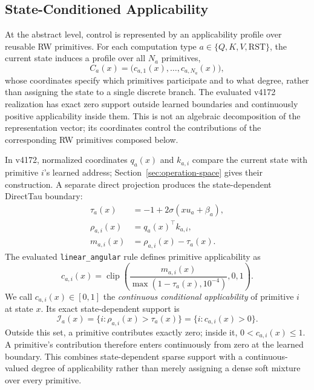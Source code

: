 \documentclass{article}
\begin{document}
\subsection{State-Conditioned Applicability}
\label{sec:applicability}

At the abstract level, control is represented by an applicability profile over
reusable RW primitives. For each computation type
\(a\in\{Q,K,V,\mathrm{RST}\}\), the current state induces a profile over all
\(N_a\) primitives,
\begin{equation}
C_a(x)=\big(c_{a,1}(x),\ldots,c_{a,N_a}(x)\big),
\label{eq:applicability_profile}
\end{equation}
whose coordinates specify which primitives participate and to what degree,
rather than assigning the state to a single discrete branch. The evaluated
v4172 realization has exact zero support outside learned boundaries and
continuously positive applicability inside them. This is not an algebraic
decomposition of the representation vector; its coordinates control the
contributions of the corresponding RW primitives composed below.

In v4172, normalized coordinates \(q_a(x)\) and \(k_{a,i}\) compare the current
state with primitive \(i\)'s learned address;
Section~\ref{sec:operation-space} gives their construction. A separate direct
projection produces the state-dependent DirectTau boundary:
\begin{align}
\tau_a(x)&=-1+2\sigma(xu_a+\beta_a),\\
\rho_{a,i}(x)&=q_a(x)^\top k_{a,i},\\
m_{a,i}(x)&=\rho_{a,i}(x)-\tau_a(x).
\label{eq:directtau}
\end{align}
The evaluated \texttt{linear\_angular} rule defines primitive applicability as
\begin{equation}
c_{a,i}(x)=
\operatorname{clip}\!\left(
\frac{m_{a,i}(x)}
{\max(1-\tau_a(x),10^{-4})},0,1\right).
\label{eq:angular_gate}
\end{equation}
We call \(c_{a,i}(x)\in[0,1]\) the \emph{continuous conditional
applicability} of primitive \(i\) at state \(x\). Its exact state-dependent
support is
\begin{equation}
\mathcal{I}_a(x)=\{i:\rho_{a,i}(x)>\tau_a(x)\}
=\{i:c_{a,i}(x)>0\}.
\label{eq:applicable_support}
\end{equation}
Outside this set, a primitive contributes exactly zero; inside it,
\(0<c_{a,i}(x)\leq1\). A primitive's contribution therefore enters
continuously from zero at the learned boundary. This combines state-dependent
sparse support with a continuous-valued degree of applicability rather than
merely assigning a dense soft mixture over every primitive.
\end{document}
